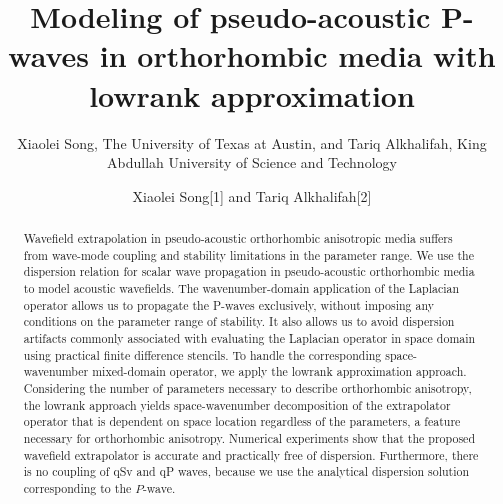 \title{Modeling of pseudo-acoustic P-waves in orthorhombic media with  lowrank approximation}
\author{Xiaolei Song, The University of Texas at Austin, and
Tariq Alkhalifah, King Abdullah University of Science and Technology
}
\maketitle
\renewcommand{\footnotemark}{} 

\author{Xiaolei Song\footnotemark[1] and Tariq Alkhalifah\footnotemark[2] 
}

\address{
\footnotemark[1]Bureau of Economic Geology \\
Jackson School of Geosciences \\
The University of Texas at Austin \\
University Station, Box X \\
Austin, TX 78713-8924 \\
USA\\
songxl@utexas.edu\\
\footnotemark[2]Physical Sciences and Engineering \\
King Abdullah University of Science and Technology \\
Mail box \# 1280 \\ 
Thuwal 23955-6900 \\
Saudi Arabia\\
tariq.alkhalifah@kaust.edu.sa
}


\begin{abstract}
Wavefield extrapolation in pseudo-acoustic orthorhombic anisotropic media suffers from 
wave-mode coupling and stability limitations in the parameter range.
We use the dispersion relation for scalar wave propagation in pseudo-acoustic orthorhombic media to model
acoustic wavefields. The wavenumber-domain application of the Laplacian operator allows us to propagate the P-waves exclusively,
without imposing any conditions on the parameter range of stability. It also allows us to avoid dispersion artifacts commonly associated
with evaluating the Laplacian operator in space domain using practical finite difference stencils.
To handle the corresponding space-wavenumber mixed-domain operator,
we apply the lowrank approximation approach. Considering the number of parameters necessary to describe orthorhombic anisotropy,
the lowrank approach yields space-wavenumber decomposition of the extrapolator operator that is dependent on space location regardless of the parameters,
a feature necessary for orthorhombic anisotropy.
Numerical experiments show that the proposed wavefield extrapolator is accurate and practically free of dispersion.
Furthermore, there is no coupling of qSv and qP waves,
because we use the analytical dispersion solution corresponding to the $P$-wave. 
\end{abstract}

